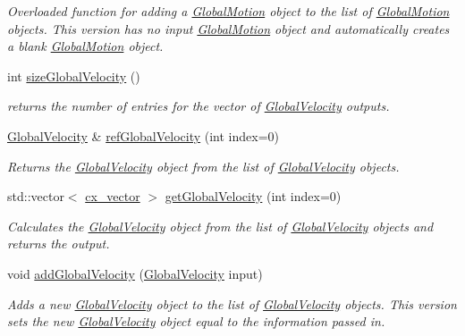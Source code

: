 \begin{DoxyCompactItemize}
\begin{DoxyCompactList}\small\item\em Overloaded function for adding a \hyperlink{classosea_1_1ofreq_1_1_global_motion}{Global\-Motion} object to the list of \hyperlink{classosea_1_1ofreq_1_1_global_motion}{Global\-Motion} objects. This version has no input \hyperlink{classosea_1_1ofreq_1_1_global_motion}{Global\-Motion} object and automatically creates a blank \hyperlink{classosea_1_1ofreq_1_1_global_motion}{Global\-Motion} object. \end{DoxyCompactList}\item 
int \hyperlink{classosea_1_1ofreq_1_1_outputs_body_af41b4423bd40c87fa87ae0af53bc96e5}{size\-Global\-Velocity} ()
\begin{DoxyCompactList}\small\item\em returns the number of entries for the vector of \hyperlink{classosea_1_1ofreq_1_1_global_velocity}{Global\-Velocity} outputs. \end{DoxyCompactList}\item 
\hyperlink{classosea_1_1ofreq_1_1_global_velocity}{Global\-Velocity} \& \hyperlink{classosea_1_1ofreq_1_1_outputs_body_a6728d42493b83db7d682ca751a8f080a}{ref\-Global\-Velocity} (int index=0)
\begin{DoxyCompactList}\small\item\em Returns the \hyperlink{classosea_1_1ofreq_1_1_global_velocity}{Global\-Velocity} object from the list of \hyperlink{classosea_1_1ofreq_1_1_global_velocity}{Global\-Velocity} objects. \end{DoxyCompactList}\item 
std\-::vector$<$ \hyperlink{namespaceosea_1_1ofreq_a42bf1d8bbba99693142c4184486ad3e0}{cx\-\_\-vector} $>$ \hyperlink{classosea_1_1ofreq_1_1_outputs_body_a16d63ba2343caa9244a461fb3d539843}{get\-Global\-Velocity} (int index=0)
\begin{DoxyCompactList}\small\item\em Calculates the \hyperlink{classosea_1_1ofreq_1_1_global_velocity}{Global\-Velocity} object from the list of \hyperlink{classosea_1_1ofreq_1_1_global_velocity}{Global\-Velocity} objects and returns the output. \end{DoxyCompactList}\item 
void \hyperlink{classosea_1_1ofreq_1_1_outputs_body_abe974976080b1b9bfa3d66ffb89b0640}{add\-Global\-Velocity} (\hyperlink{classosea_1_1ofreq_1_1_global_velocity}{Global\-Velocity} input)
\begin{DoxyCompactList}\small\item\em Adds a new \hyperlink{classosea_1_1ofreq_1_1_global_velocity}{Global\-Velocity} object to the list of \hyperlink{classosea_1_1ofreq_1_1_global_velocity}{Global\-Velocity} objects. This version sets the new \hyperlink{classosea_1_1ofreq_1_1_global_velocity}{Global\-Velocity} object equal to the information passed in. \end{DoxyCompactList}\item 

\end{DoxyCompactItemize}
